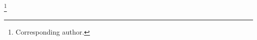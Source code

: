 \documentclass[aps,prc,onecolumn,floatfix,showpacs,preprintnumbers,amsmath,amssymb,superscriptaddress]{revtex4-1}
\begin{document}
\author {Michael~C.~Kunkel}
\affiliation{\ODU}
\author {Moskov~J.~Amaryan}
\thanks{Corresponding author.}
\affiliation{\ODU}
\author {Igor~I.~Strakovsky}
\affiliation{\GWU}
\author {James~Ritman}
\affiliation{\BOCHUM}

\end{document}
